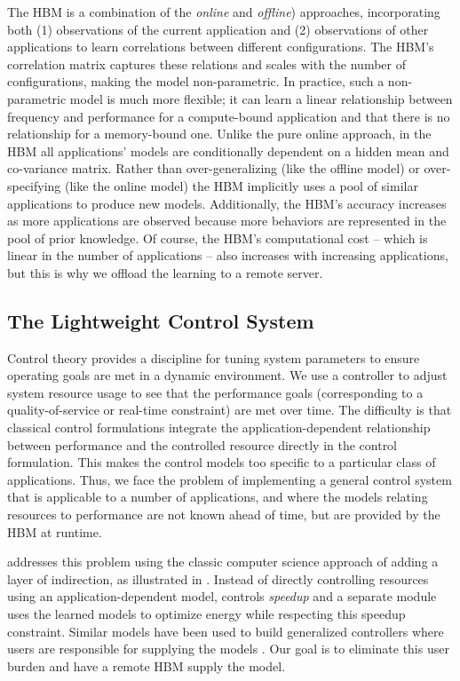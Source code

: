 The HBM is a combination of the \emph{online} and \emph{offline})
approaches, incorporating both (1) observations of the current
application and (2) observations of other applications to learn
correlations between different configurations.  The HBM's correlation
matrix captures these relations and scales with the number of
configurations, making the model non-parametric.  In practice, such a
non-parametric model is much more flexible; \eg{} it can learn a
linear relationship between frequency and performance for a
compute-bound application and that there is no relationship for a
memory-bound one.  Unlike the pure online approach, in the HBM all
applications' models are conditionally dependent on a hidden mean and co-variance
matrix.  Rather than over-generalizing (like the offline model) or
over-specifying (like the online model) the HBM implicitly uses a pool
of similar applications to produce new models. Additionally, the HBM's
accuracy increases as more applications are observed because more
behaviors are represented in the pool of prior knowledge.  Of
course, the HBM's computational cost -- which is linear in the number
of applications -- also increases with increasing applications, but
this is why we offload the learning to a remote server.

\subsection{The Lightweight Control System}

Control theory provides a discipline for tuning system parameters to
ensure operating goals are met in a dynamic environment.
We use a controller to adjust system resource usage to see that the
performance goals (corresponding to a quality-of-service or real-time
constraint) are met over time.  The difficulty is that classical
control formulations integrate the application-dependent relationship
between performance and the controlled resource directly in the
control formulation. This makes the control models too specific to a
particular class of applications.  Thus, we face the problem of
implementing a general control system that is applicable to a number
of applications, and where the models relating resources to
performance are not known ahead of time, but are provided by the HBM
at runtime.

\SYSTEM{} addresses this problem using the classic computer science
approach of adding a layer of indirection, as illustrated in
.  Instead of directly controlling resources
using an application-dependent model, \SYSTEM{} controls
\emph{speedup} and a separate module uses the learned models to
optimize energy while respecting this speedup constraint.  Similar
models have been used to build generalized controllers where users are
responsible for supplying the models \cite{ControlWare,POET}.  Our
goal is to eliminate this user burden and have a remote HBM supply the
model.

